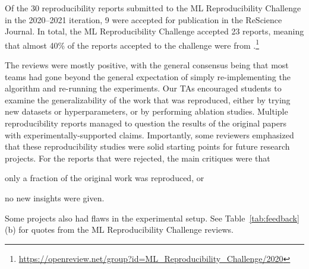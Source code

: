 Of the 30 reproducibility reports submitted to the ML Reproducibility Challenge in the 2020--2021 iteration, 9 were accepted for publication in the ReScience Journal.  
In total, the ML Reproducibility Challenge accepted 23 reports, meaning that almost 40\% of the reports accepted to the challenge were from \OurUniversity{}.\footnote{\url{https://openreview.net/group?id=ML_Reproducibility_Challenge/2020}}
 
The reviews were mostly positive, with the general consensus being that most teams had gone beyond the general expectation of simply re-implementing the algorithm and re-running the experiments. 
Our TAs encouraged students to examine the generalizability of the work that was reproduced, either by trying new datasets or hyperparameters, or by performing ablation studies. 
Multiple reproducibility reports managed to question the results of the original papers with experimentally-supported claims. 
Importantly, some reviewers emphasized that these reproducibility studies were solid starting points for future research projects. 
For the reports that were rejected, the main critiques were that
\begin{enumerate*}[label=(\roman*)]
    \item only a fraction of the original work was reproduced, or 
    \item no new insights were given.
\end{enumerate*}
Some projects also had flaws in the experimental setup. 
See Table~\ref{tab:feedback}(b) for quotes from the ML Reproducibility Challenge reviews.  









